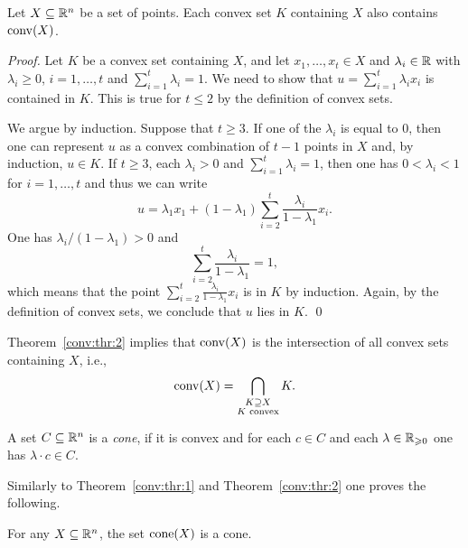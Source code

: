 \begin{theorem}
  \label{conv:thr:2}
  Let $X\subseteq\mathbb{R}^n$ be a set of points. Each convex set $K$ containing $X$
  also contains $\operatorname{conv}(X)$. 
\end{theorem}

\begin{proof}
  Let $K$ be a convex set containing $X$, 
  and let $x_1,\ldots,x_t\in X$ and $\lambda_i\in \mathbb{R}$ with $\lambda_i\geq0$, $i=1,\ldots,t$ and
  $\sum_{i=1}^t  \lambda_i =1$. We need to show that $u = \sum_{i=1}^t \lambda_i
  x_i$ is contained in  $K$.   This is true for $t\leq2$ by the definition
  of convex sets.  

  We argue by induction.  Suppose that $t\geq3$. If one of the $\lambda_i$ is
  equal   to $0$, then one can represent $u$ as a convex combination
  of $t-1$ points in $X$ and, by induction, $u \in K$. If    $t\geq3$,
  each $\lambda_i>0$ and $\sum_{i=1}^t \lambda_i = 1$, then one has $0<\lambda_i<1$ for
  $i=1,\ldots,t$ and thus we can write 
  \begin{displaymath}
    u = \lambda_1 x_1 + (1-\lambda_1) \sum_{i=2}^t \frac{\lambda_i}{1-\lambda_1} x_i. 
  \end{displaymath}
  One has $\lambda_i / (1-\lambda_1)>0$ and 
  \begin{displaymath}
    \sum_{i=2}^t \frac{\lambda_i}{1-\lambda_1} = 1,
  \end{displaymath}
  which means that the point $\sum_{i=2}^t \frac{\lambda_i}{1-\lambda_1} x_i$ is in
  $K$ by induction. Again, by the definition of convex sets, we
  conclude that $u$ lies in $K$. 
\qed \end{proof}

Theorem~\ref{conv:thr:2} implies that $\operatorname{conv}(X)$ is the intersection of all
convex sets containing $X$, i.e., 
\begin{displaymath}
  \operatorname{conv}(X) = \bigcap_{\substack{K \supseteq X\\ K \text{  convex}}} K. 
\end{displaymath}



\begin{definition}
  \label{conv:def:4}
  A set $C\subseteq\mathbb{R}^n$ is a \emph{cone}, if it is convex and for each $c \in
  C$ and each $\lambda \in \mathbb{R}_{\geqslant0}$ one has  $\lambda\cdot c \in C$. 
\end{definition}

Similarly to Theorem~\ref{conv:thr:1} and Theorem~\ref{conv:thr:2} one proves
the following. 
\begin{theorem}
  \label{conv:thr:8}
  For any $X\subseteq\mathbb{R}^n$, the set $\mathrm{cone}(X)$ is a cone. 
\end{theorem}

